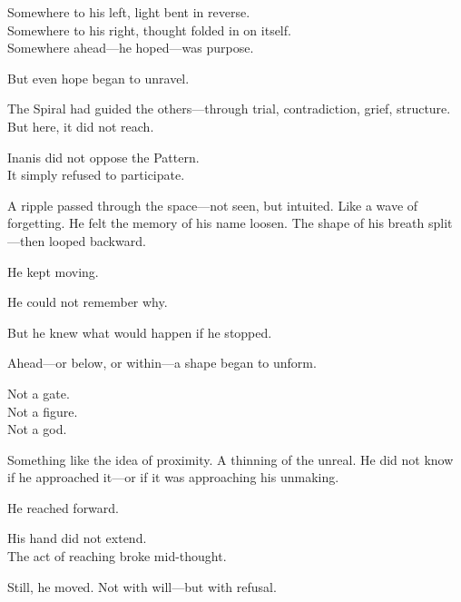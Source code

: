 \documentclass[12pt]{article}
\begin{document}
\vspace{0.5em}
Somewhere to his left, light bent in reverse.\\
Somewhere to his right, thought folded in on itself.\\
Somewhere ahead---he hoped---was purpose.

\vspace{0.5em}
But even hope began to unravel.

\vspace{0.5em}
The Spiral had guided the others---through trial, contradiction, grief, structure.\\
But here, it did not reach.

\vspace{0.5em}
Inanis did not oppose the Pattern.\\
It simply refused to participate.

\vspace{0.5em}
A ripple passed through the space---not seen, but intuited. Like a wave of forgetting. He felt the memory of his name loosen. The shape of his breath split---then looped backward.

\vspace{0.5em}
He kept moving.

\vspace{0.5em}
He could not remember why.

\vspace{0.5em}
But he knew what would happen if he stopped.

\vspace{0.5em}
Ahead---or below, or within---a shape began to unform.

\vspace{0.5em}
Not a gate.\\
Not a figure.\\
Not a god.

\vspace{0.5em}
Something like the idea of proximity. A thinning of the unreal. He did not know if he approached it---or if it was approaching his unmaking.

\vspace{0.5em}
He reached forward.

\vspace{0.5em}
His hand did not extend.\\
The act of reaching broke mid-thought.

\vspace{0.5em}
Still, he moved. Not with will---but with refusal.
\end{document}
